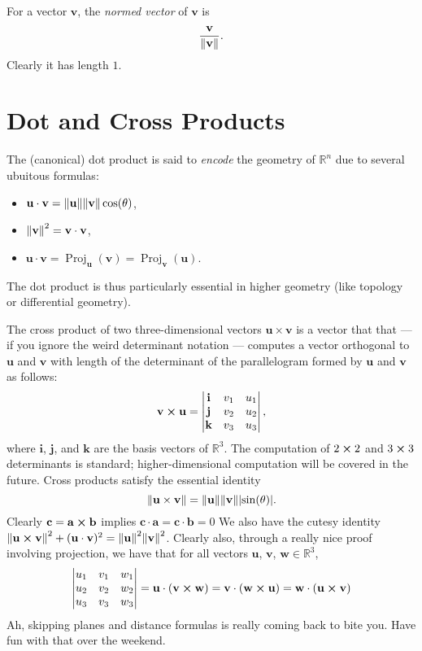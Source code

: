 \documentclass[11pt]{article}
\begin{document}
For a vector $\mathbf{v}$, the \textit{normed vector} of $\mathbf{v}$ is \[ \frac{\mathbf{v}}{\norm{\mathbf{v}}}. \] Clearly it has length $1$.


\section{Dot and Cross Products}

The (canonical) dot product is said to \textit{encode} the geometry of $\mathbb{R}^{n}$ due to several ubuitous formulas:
\begin{itemize}
	\item $\mathbf{u} \cdot \mathbf{v} = \norm{\mathbf{u}} \norm{\mathbf{v}} \cos (\theta)$,
	\item $\norm{\mathbf{v}}^2 = \mathbf{v} \cdot \mathbf{v}$,
	\item $\mathbf{u} \cdot \mathbf{v} = \operatorname{Proj}_{\mathbf{u}} (\mathbf{v}) = \operatorname{Proj}_{\mathbf{v}} (\mathbf{u}).$
\end{itemize}
The dot product is thus particularly essential in higher geometry (like topology or differential geometry).

The cross product of two three-dimensional vectors $\mathbf{u} \times \mathbf{v}$ is a vector that that --- if you ignore the weird determinant notation --- computes a vector orthogonal to $\mathbf{u}$ and $\mathbf{v}$ with length of the determinant of the parallelogram formed by $\mathbf{u}$ and $\mathbf{v}$ as follows:
\[
	\mathbf{v} \cross \mathbf{u} =
	\begin{vmatrix}
		\mathbf{i} & v_{1} & u_{1} \\
		\mathbf{j} & v_{2} & u_{2} \\
		\mathbf{k} & v_{3} & u_{3}
	\end{vmatrix},
\]
where $\mathbf{i}$, $\mathbf{j}$, and $\mathbf{k}$ are the basis vectors of $\mathbb{R}^{3}$. The computation of $2 \cross 2$ and $3 \cross 3$ determinants is standard; higher-dimensional computation will be covered in the future. Cross products satisfy the essential identity 
\[ 
	\norm{\mathbf{u} \times \mathbf{v}} = \norm{\mathbf{u}} \norm{\mathbf{v}} \abs{\sin(\theta)}.
\]
Clearly $\mathbf{c} = \mathbf{a} \cross \mathbf{b}$ implies $\mathbf{c} \cdot \mathbf{a} = \mathbf{c} \cdot \mathbf{b} = 0$ We also have the cutesy identity $\norm{\mathbf{u} \cross \mathbf{v}}^2 + (\mathbf{u} \cdot \mathbf{v})^2 = \norm{\mathbf{u}}^2 \norm{\mathbf{v}}^2$. Clearly also, through a really nice proof involving projection, we have that
for all vectors $\mathbf{u}$, $\mathbf{v}$, $\mathbf{w} \in \mathbb{R}^{3}$,
\[
	\begin{vmatrix}
		u_{1} & v_{1} & w_{1} \\
		u_{2} & v_{2} & w_{2} \\
		u_{3} & v_{3} & w_{3}
	\end{vmatrix}
	= \mathbf{u} \cdot (\mathbf{v} \cross \mathbf{w}) = \mathbf{v} \cdot (\mathbf{w} \cross \mathbf{u}) = \mathbf{w} \cdot (\mathbf{u} \cross \mathbf{v})
\]
Ah, skipping planes and distance formulas is really coming back to bite you. Have fun with that over the weekend.
\end{document}
